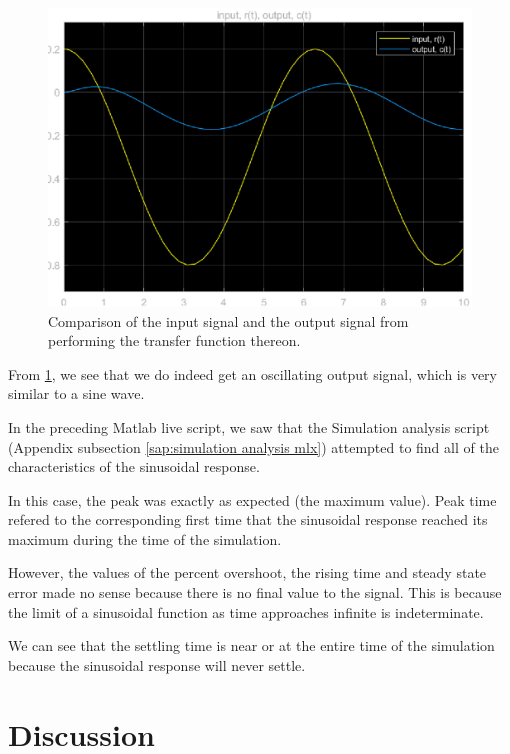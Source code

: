 \documentclass[12pt]{article}
\begin{document}
\begin{figure}[h]
    \centering
    \includegraphics[width=\linewidth]{part02_scope.eps}
    \caption{Comparison of the input signal and the output signal from performing the transfer function thereon.}
    \label{fig:part02_scope}
\end{figure}

From \ref{fig:part02_scope}, we see that we do indeed get an oscillating output signal, which is very similar to a sine wave.



In the preceding Matlab live script,
we saw that
the Simulation analysis script (Appendix subsection \ref{sap:simulation analysis mlx})
attempted to find all of the characteristics of the sinusoidal response.

In this case, the peak was exactly as expected (the maximum value).
Peak time refered to the corresponding first time that the sinusoidal response reached its maximum
during the time of the simulation.

However, the values of the percent overshoot, the rising time and steady state error made no sense because there is no final value to the signal.
This is because the limit of a sinusoidal function as time approaches infinite is indeterminate.

We can see that the settling time is near or at the entire time of the simulation because the sinusoidal response will never settle.

\section{Discussion}
\end{document}
